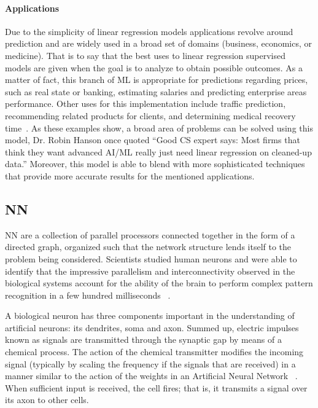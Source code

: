 \paragraph{Applications}

Due to the simplicity of linear regression models applications revolve around prediction and are 
widely used in a broad set of domains (\eg business, economics, or medicine). That is to say that the 
best uses to linear regression supervised models are given when the goal is to analyze to obtain 
possible outcomes. As a matter of fact, this branch of \ac{ML} is appropriate for predictions regarding 
prices, such as real state or banking, estimating salaries and predicting enterprise areas performance. 
Other uses for this implementation include traffic prediction, recommending related products for 
clients, and determining medical recovery time~\cite{grandeur17}. As these examples show, a broad 
area of  problems can be solved using this model, Dr. Robin Hanson once quoted ``Good CS expert 
says: Most firms that think they want advanced AI/ML really just need linear regression on cleaned-up 
data.'' Moreover, this model is able to blend with more sophisticated techniques that provide more 
accurate results for the mentioned applications. 


\subsection{\acl{NN}}

\ac{NN} are a collection of parallel processors connected together in the form of a directed graph, organized such that the network structure lends itself to the problem being considered. Scientists studied human neurons and were able to identify that the impressive parallelism and interconnectivity observed in the biological systems account for the ability of the brain to perform complex pattern recognition in a few hundred milliseconds ~\cite{freeman91}.

A biological neuron has three components important in the understanding of artificial neurons: its dendrites, soma and axon. Summed up, electric impulses known as signals are transmitted through the synaptic gap by means of a chemical process. The action of the chemical transmitter modifies the incoming signal (typically by scaling the frequency if the signals that are received) in a manner similar to the action of the weights in an Artificial Neural Network ~\cite{fausett93}. When sufficient input is received, the cell fires; that is, it transmits a signal over its axon to other cells. 

